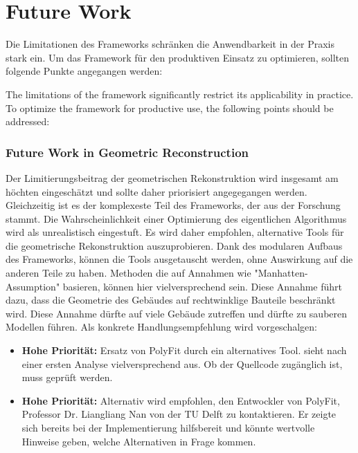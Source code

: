 \section{Future Work}
\begin{German}
    Die Limitationen des Frameworks schränken die Anwendbarkeit in der Praxis stark ein. Um das Framework für den produktiven Einsatz zu optimieren, sollten folgende Punkte angegangen werden:
\end{German}

\begin{English}
    The limitations of the framework significantly restrict its applicability in practice. To optimize the framework for productive use, the following points should be addressed:
\end{English}

\subsubsection{Future Work in Geometric Reconstruction}
\begin{German}
    Der Limitierungsbeitrag der geometrischen Rekonstruktion wird insgesamt am höchten eingeschätzt und sollte daher priorisiert angegegangen werden. Gleichzeitig ist es der komplexeste Teil des Frameworks, der aus der Forschung stammt. Die Wahrscheinlichkeit einer Optimierung des eigentlichen Algorithmus wird als unrealistisch eingestuft. Es wird daher empfohlen, alternative Tools für die geometrische Rekonstruktion auszuprobieren. Dank des modularen Aufbaus des Frameworks, können die Tools ausgetauscht werden, ohne Auswirkung auf die anderen Teile zu haben. Methoden die auf Annahmen wie "Manhatten-Assumption" basieren, können hier vielversprechend sein. Diese Annahme führt dazu, dass die Geometrie des Gebäudes auf rechtwinklige Bauteile beschränkt wird. Diese Annahme dürfte auf viele Gebäude zutreffen und dürfte zu sauberen Modellen führen. Als konkrete Handlungsempfehlung wird vorgeschalgen:

    \begin{itemize}
        \item \textbf{Hohe Priorität:} Ersatz von PolyFit durch ein alternatives Tool. \cite{wangReconstructionLoD2Building2023} sieht nach einer ersten Analyse vielversprechend aus. Ob der Quellcode zugänglich ist, muss geprüft werden.
        \item \textbf{Hohe Priorität:} Alternativ wird empfohlen, den Entwockler von PolyFit, Professor Dr. Liangliang Nan von der TU Delft zu kontaktieren. Er zeigte sich bereits bei der Implementierung hilfsbereit und könnte wertvolle Hinweise geben, welche Alternativen in Frage kommen.
    \end{itemize}
\end{German}

